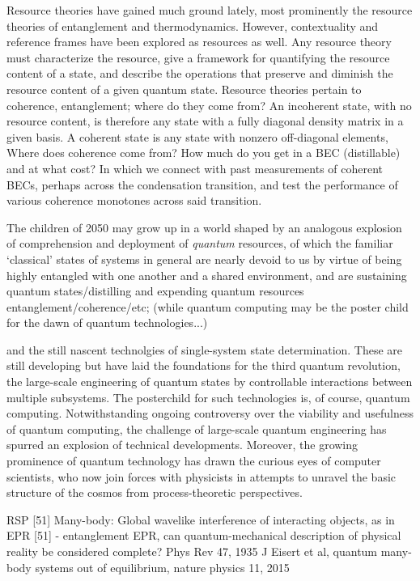 	Resource theories have gained much ground lately, most prominently the resource theories of entanglement and thermodynamics.
	However, contextuality and reference frames have been explored as resources as well.
	Any resource theory must characterize the resource, give a framework for quantifying the resource content of a state, and describe the operations that preserve and diminish the resource content of a given quantum state.
	Resource theories pertain to coherence, entanglement; where do they come from? An incoherent state, with no resource content, is therefore any state with a fully diagonal density matrix in a given basis.
	A coherent state is any state with  nonzero off-diagonal elements, Where does coherence come from? How much do you get in a BEC (distillable) and at what cost?	In which we connect with past measurements of coherent BECs, perhaps across the condensation transition, and test the performance of various coherence monotones across said transition.


The children of 2050 may grow up in a world shaped by an analogous explosion of comprehension and deployment of \emph{quantum} resources, of which the familiar `classical' states of systems in general are nearly devoid to us by virtue of being highly entangled with one another and a shared environment, and are sustaining quantum states/distilling and expending quantum resources entanglement/coherence/etc; (while quantum computing may be the poster child for the dawn of quantum technologies...)

	and the still nascent technolgies of single-system state determination.
	These are still developing but have laid the foundations for the third
	quantum revolution, the large-scale engineering of quantum states by
	controllable interactions between multiple subsystems.
	The posterchild
	for such technologies is, of course, quantum computing.
	Notwithstanding
	ongoing controversy over the viability and usefulness of quantum
	computing, the challenge of large-scale quantum engineering has spurred
	an explosion of technical developments.
	Moreover, the growing prominence
	of quantum technology has drawn the curious eyes of computer scientists,
	who now join forces with physicists in attempts to unravel the basic
	structure of the cosmos from process-theoretic perspectives.


	RSP [51] Many-body: Global wavelike interference of interacting objects, as in EPR [51] - entanglement 
	EPR, can quantum-mechanical description of physical reality be considered complete? Phys Rev 47, 1935
	J Eisert et al, quantum many-body systems out of equilibrium, nature physics 11, 2015

